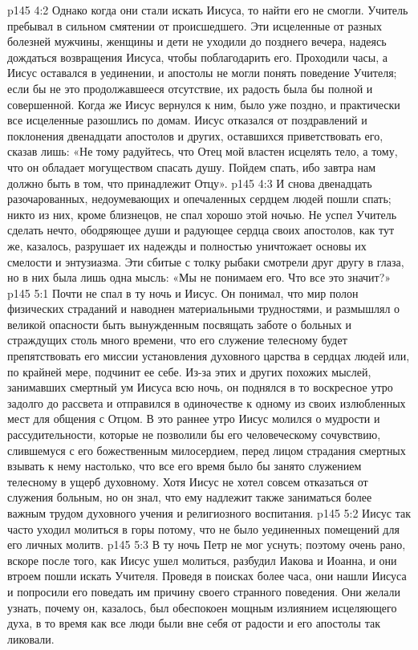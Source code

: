\vs p145 4:2 Однако когда они стали искать Иисуса, то найти его не смогли. Учитель пребывал в сильном смятении от происшедшего. Эти исцеленные от разных болезней мужчины, женщины и дети не уходили до позднего вечера, надеясь дождаться возвращения Иисуса, чтобы поблагодарить его. Проходили часы, а Иисус оставался в уединении, и апостолы не могли понять поведение Учителя; если бы не это продолжавшееся отсутствие, их радость была бы полной и совершенной. Когда же Иисус вернулся к ним, было уже поздно, и практически все исцеленные разошлись по домам. Иисус отказался от поздравлений и поклонения двенадцати апостолов и других, оставшихся приветствовать его, сказав лишь: «Не тому радуйтесь, что Отец мой властен исцелять тело, а тому, что он обладает могуществом спасать душу. Пойдем спать, ибо завтра нам должно быть в том, что принадлежит Отцу».
\vs p145 4:3 И снова двенадцать разочарованных, недоумевающих и опечаленных сердцем людей пошли спать; никто из них, кроме близнецов, не спал хорошо этой ночью. Не успел Учитель сделать нечто, ободряющее души и радующее сердца своих апостолов, как тут же, казалось, разрушает их надежды и полностью уничтожает основы их смелости и энтузиазма. Эти сбитые с толку рыбаки смотрели друг другу в глаза, но в них была лишь одна мысль: «Мы не понимаем его. Что все это значит?»
\vs p145 5:1 Почти не спал в ту ночь и Иисус. Он понимал, что мир полон физических страданий и наводнен материальными трудностями, и размышлял о великой опасности быть вынужденным посвящать заботе о больных и страждущих столь много времени, что его служение телесному будет препятствовать его миссии установления духовного царства в сердцах людей или, по крайней мере, подчинит ее себе. Из\hyp{}за этих и других похожих мыслей, занимавших смертный ум Иисуса всю ночь, он поднялся в то воскресное утро задолго до рассвета и отправился в одиночестве к одному из своих излюбленных мест для общения с Отцом. В это раннее утро Иисус молился о мудрости и рассудительности, которые не позволили бы его человеческому сочувствию, слившемуся с его божественным милосердием, перед лицом страдания смертных взывать к нему настолько, что все его время было бы занято служением телесному в ущерб духовному. Хотя Иисус не хотел совсем отказаться от служения больным, но он знал, что ему надлежит также заниматься более важным трудом духовного учения и религиозного воспитания.
\vs p145 5:2 Иисус так часто уходил молиться в горы потому, что не было уединенных помещений для его личных молитв.
\vs p145 5:3 В ту ночь Петр не мог уснуть; поэтому очень рано, вскоре после того, как Иисус ушел молиться, разбудил Иакова и Иоанна, и они втроем пошли искать Учителя. Проведя в поисках более часа, они нашли Иисуса и попросили его поведать им причину своего странного поведения. Они желали узнать, почему он, казалось, был обеспокоен мощным излиянием исцеляющего духа, в то время как все люди были вне себя от радости и его апостолы так ликовали.
